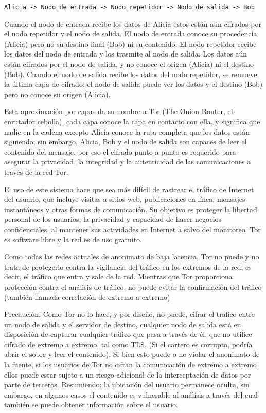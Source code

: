 \documentclass[10pt,a5paper,twoside,,]{book}
\begin{document}
\begin{verbatim}
Alicia -> Nodo de entrada -> Nodo repetidor -> Nodo de salida -> Bob
\end{verbatim}

Cuando el nodo de entrada recibe los datos de Alicia estos están aún
cifrados por el nodo repetidor y el nodo de salida. El nodo de entrada
conoce su procedencia (Alicia) pero no su destino final (Bob) ni su
contenido. El nodo repetidor recibe los datos del nodo de entrada y los
trasmite al nodo de salida. Los datos aún están cifrados por el nodo de
salida, y no conoce el origen (Alicia) ni el destino (Bob). Cuando el
nodo de salida recibe los datos del nodo repetidor, se remueve la última
capa de cifrado: el nodo de salida puede ver los datos y el destino
(Bob) pero no conoce su origen (Alicia).

Esta aproximación por capas da su nombre a Tor (The Onion Router, el
enrutador cebolla), cada capa conoce la capa en contacto con ella, y
significa que nadie en la cadena excepto Alicia conoce la ruta completa
que los datos están siguiendo; sin embargo, Alicia, Bob y el nodo de
salida son capaces de leer el contenido del mensaje, por eso el cifrado
punto a punto es requerido para asegurar la privacidad, la integridad y
la autenticidad de las comunicaciones a través de la red Tor.

El uso de este sistema hace que sea más difícil de rastrear el tráfico
de Internet del usuario, que incluye visitas a sitios web, publicaciones
en línea, mensajes instantáneos y otras formas de comunicación. Su
objetivo es proteger la libertad personal de los usuarios, la privacidad
y capacidad de hacer negocios confidenciales, al mantener sus
actividades en Internet a salvo del monitoreo. Tor es software libre y
la red es de uso gratuito.

Como todas las redes actuales de anonimato de baja latencia, Tor no
puede y no trata de protegerlo contra la vigilancia del tráfico en los
extremos de la red, es decir, el tráfico que entra y sale de la red.
Mientras que Tor proporciona protección contra el análisis de tráfico,
no puede evitar la confirmación del tráfico (también llamada correlación
de extremo a extremo)

Precaución: Como Tor no lo hace, y por diseño, no puede, cifrar el
tráfico entre un nodo de salida y el servidor de destino, cualquier nodo
de salida está en disposición de capturar cualquier tráfico que pasa a
través de él, que no utilice cifrado de extremo a extremo, tal como TLS.
(Si el cartero es corrupto, podría abrir el sobre y leer el contenido).
Si bien esto puede o no violar el anonimato de la fuente, si los
usuarios de Tor no cifran la comunicación de extremo a extremo ellos
puede estar sujeto a un riesgo adicional de la interceptación de datos
por parte de terceros. Resumiendo: la ubicación del usuario permanece
oculta, sin embargo, en algunos casos el contenido es vulnerable al
análisis a través del cual también se puede obtener información sobre el
usuario.
\end{document}
